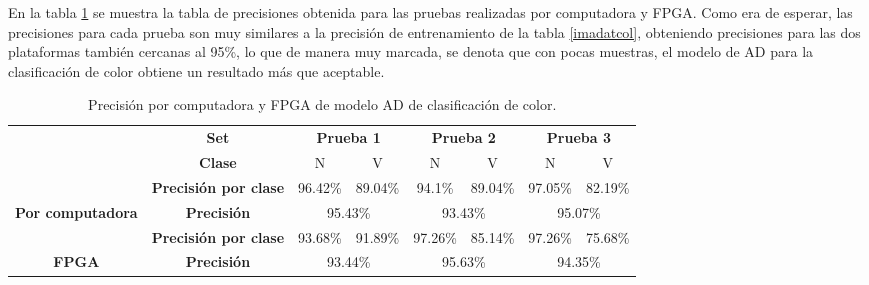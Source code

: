 \documentclass[twoside,spanish,ESP,MSc]{plantillaLabUPV}
\theoremstyle{definition}
\begin{document}
En la tabla \ref{accimadatcol} se muestra la tabla de precisiones obtenida para las pruebas realizadas por computadora y FPGA. Como era de esperar, las precisiones para cada prueba son muy similares a la precisión de entrenamiento de la tabla \ref{imadatcol}, obteniendo precisiones para las dos plataformas también cercanas al 95\%, lo que de manera muy marcada, se denota que con pocas muestras, el modelo de AD para la clasificación de color obtiene un resultado más que aceptable.


\begin{table}[h]
	\caption{Precisión por computadora y FPGA de modelo AD de clasificación de color.}
	\label{accimadatcol}
	\centering
\begin{tabular}{c|c|c|c|c|c|c|c|}
	\cline{2-8}
	& \textbf{Set}                    & \multicolumn{2}{c|}{\textbf{Prueba 1}}              & \multicolumn{2}{c|}{\textbf{Prueba 2}}              & \multicolumn{2}{c|}{\textbf{Prueba 3}}              \\ \cline{2-8} 
	& \textbf{Clase}                                & {\color[HTML]{F56B00} N} & {\color[HTML]{009901} V} & {\color[HTML]{F56B00} N} & {\color[HTML]{009901} V} & {\color[HTML]{F56B00} N} & {\color[HTML]{009901} V} \\ \hline
	\multicolumn{1}{|c|}{}                                           & \textbf{Precisión por clase}    & 96.42\%                  & 89.04\%                  & 94.1\%                      & 89.04\%                      & 97.05\%                        & 82.19\%                      \\ \cline{2-8} 
	\multicolumn{1}{|c|}{\multirow{-2}{*}{\textbf{Por computadora}}} & \textbf{Precisión}              & \multicolumn{2}{c|}{95.43\%}                        & \multicolumn{2}{c|}{93.43\%}                            & \multicolumn{2}{c|}{95.07\%}                            \\ \hline
	\multicolumn{1}{|c|}{}                                           & \textbf{Precisión por clase}    & 93.68\%                  & 91.89\%                  & 97.26\%                      & 85.14\%                      & 97.26\%                      & 75.68\%                      \\ \cline{2-8} 
	\multicolumn{1}{|c|}{\multirow{-2}{*}{\textbf{FPGA}}}            & \textbf{Precisión}              & \multicolumn{2}{c|}{93.44\%}                        & \multicolumn{2}{c|}{95.63\%}                            & \multicolumn{2}{c|}{94.35\%}                            \\ \hline
\end{tabular}
\end{table}
\end{document}

